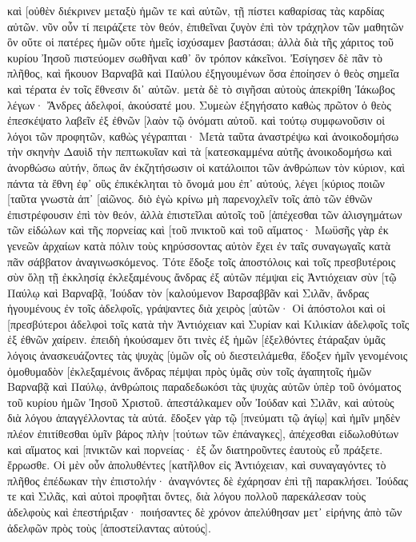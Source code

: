 καὶ [οὐθὲν διέκρινεν μεταξὺ ἡμῶν τε καὶ αὐτῶν, τῇ πίστει καθαρίσας τὰς καρδίας αὐτῶν. 
νῦν οὖν τί πειράζετε τὸν θεόν, ἐπιθεῖναι ζυγὸν ἐπὶ τὸν τράχηλον τῶν μαθητῶν ὃν οὔτε οἱ πατέρες ἡμῶν οὔτε ἡμεῖς ἰσχύσαμεν βαστάσαι; 
ἀλλὰ διὰ τῆς χάριτος τοῦ κυρίου Ἰησοῦ πιστεύομεν σωθῆναι καθ᾽ ὃν τρόπον κἀκεῖνοι. 
Ἐσίγησεν δὲ πᾶν τὸ πλῆθος, καὶ ἤκουον Βαρναβᾶ καὶ Παύλου ἐξηγουμένων ὅσα ἐποίησεν ὁ θεὸς σημεῖα καὶ τέρατα ἐν τοῖς ἔθνεσιν δι᾽ αὐτῶν. 
μετὰ δὲ τὸ σιγῆσαι αὐτοὺς ἀπεκρίθη Ἰάκωβος λέγων· Ἄνδρες ἀδελφοί, ἀκούσατέ μου. 
Συμεὼν ἐξηγήσατο καθὼς πρῶτον ὁ θεὸς ἐπεσκέψατο λαβεῖν ἐξ ἐθνῶν [λαὸν τῷ ὀνόματι αὐτοῦ. 
καὶ τούτῳ συμφωνοῦσιν οἱ λόγοι τῶν προφητῶν, καθὼς γέγραπται· 
Μετὰ ταῦτα ἀναστρέψω καὶ ἀνοικοδομήσω τὴν σκηνὴν Δαυὶδ τὴν πεπτωκυῖαν καὶ τὰ [κατεσκαμμένα αὐτῆς ἀνοικοδομήσω καὶ ἀνορθώσω αὐτήν, 
ὅπως ἂν ἐκζητήσωσιν οἱ κατάλοιποι τῶν ἀνθρώπων τὸν κύριον, καὶ πάντα τὰ ἔθνη ἐφ᾽ οὓς ἐπικέκληται τὸ ὄνομά μου ἐπ᾽ αὐτούς, λέγει [κύριος ποιῶν [ταῦτα 
γνωστὰ ἀπ᾽ [αἰῶνος. 
διὸ ἐγὼ κρίνω μὴ παρενοχλεῖν τοῖς ἀπὸ τῶν ἐθνῶν ἐπιστρέφουσιν ἐπὶ τὸν θεόν, 
ἀλλὰ ἐπιστεῖλαι αὐτοῖς τοῦ [ἀπέχεσθαι τῶν ἀλισγημάτων τῶν εἰδώλων καὶ τῆς πορνείας καὶ [τοῦ πνικτοῦ καὶ τοῦ αἵματος· 
Μωϋσῆς γὰρ ἐκ γενεῶν ἀρχαίων κατὰ πόλιν τοὺς κηρύσσοντας αὐτὸν ἔχει ἐν ταῖς συναγωγαῖς κατὰ πᾶν σάββατον ἀναγινωσκόμενος. 
Τότε ἔδοξε τοῖς ἀποστόλοις καὶ τοῖς πρεσβυτέροις σὺν ὅλῃ τῇ ἐκκλησίᾳ ἐκλεξαμένους ἄνδρας ἐξ αὐτῶν πέμψαι εἰς Ἀντιόχειαν σὺν [τῷ Παύλῳ καὶ Βαρναβᾷ, Ἰούδαν τὸν [καλούμενον Βαρσαββᾶν καὶ Σιλᾶν, ἄνδρας ἡγουμένους ἐν τοῖς ἀδελφοῖς, 
γράψαντες διὰ χειρὸς [αὐτῶν· Οἱ ἀπόστολοι καὶ οἱ [πρεσβύτεροι ἀδελφοὶ τοῖς κατὰ τὴν Ἀντιόχειαν καὶ Συρίαν καὶ Κιλικίαν ἀδελφοῖς τοῖς ἐξ ἐθνῶν χαίρειν. 
ἐπειδὴ ἠκούσαμεν ὅτι τινὲς ἐξ ἡμῶν [ἐξελθόντες ἐτάραξαν ὑμᾶς λόγοις ἀνασκευάζοντες τὰς ψυχὰς [ὑμῶν οἷς οὐ διεστειλάμεθα, 
ἔδοξεν ἡμῖν γενομένοις ὁμοθυμαδὸν [ἐκλεξαμένοις ἄνδρας πέμψαι πρὸς ὑμᾶς σὺν τοῖς ἀγαπητοῖς ἡμῶν Βαρναβᾷ καὶ Παύλῳ, 
ἀνθρώποις παραδεδωκόσι τὰς ψυχὰς αὐτῶν ὑπὲρ τοῦ ὀνόματος τοῦ κυρίου ἡμῶν Ἰησοῦ Χριστοῦ. 
ἀπεστάλκαμεν οὖν Ἰούδαν καὶ Σιλᾶν, καὶ αὐτοὺς διὰ λόγου ἀπαγγέλλοντας τὰ αὐτά. 
ἔδοξεν γὰρ τῷ [πνεύματι τῷ ἁγίῳ] καὶ ἡμῖν μηδὲν πλέον ἐπιτίθεσθαι ὑμῖν βάρος πλὴν [τούτων τῶν ἐπάναγκες], 
ἀπέχεσθαι εἰδωλοθύτων καὶ αἵματος καὶ [πνικτῶν καὶ πορνείας· ἐξ ὧν διατηροῦντες ἑαυτοὺς εὖ πράξετε. ἔρρωσθε. 
Οἱ μὲν οὖν ἀπολυθέντες [κατῆλθον εἰς Ἀντιόχειαν, καὶ συναγαγόντες τὸ πλῆθος ἐπέδωκαν τὴν ἐπιστολήν· 
ἀναγνόντες δὲ ἐχάρησαν ἐπὶ τῇ παρακλήσει. 
Ἰούδας τε καὶ Σιλᾶς, καὶ αὐτοὶ προφῆται ὄντες, διὰ λόγου πολλοῦ παρεκάλεσαν τοὺς ἀδελφοὺς καὶ ἐπεστήριξαν· 
ποιήσαντες δὲ χρόνον ἀπελύθησαν μετ᾽ εἰρήνης ἀπὸ τῶν ἀδελφῶν πρὸς τοὺς [ἀποστείλαντας αὐτούς]. 
